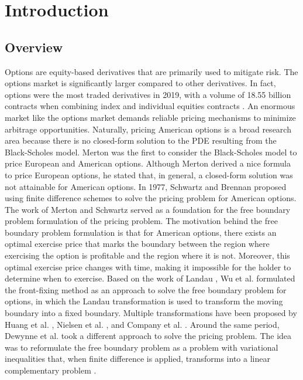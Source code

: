 \section{Introduction}

\subsection{Overview}

Options are equity-based derivatives that are primarily used to mitigate risk. The options market is significantly larger compared to other derivatives. In fact, options were the most traded derivatives in 2019, with a volume of 18.55 billion contracts when combining index and individual equities contracts \cite{statista_2019}. An enormous market like the options market demands reliable pricing mechanisms to minimize arbitrage opportunities. Naturally, pricing American options is a broad research area because there is no closed-form solution to the PDE resulting from the Black-Scholes model. Merton\cite{merton_1973} was the first to consider the Black-Scholes\cite{black_scholes_1973} model to price European and American options. Although Merton derived a nice formula to price European options, he stated that, in general, a closed-form solution was not attainable for American options. In 1977, Schwartz \cite{schwartz_197779} and Brennan \cite{brennan_1997} proposed using finite difference schemes to solve the pricing problem for American options. The work of Merton and Schwartz served as a foundation for the free boundary problem formulation of the pricing problem. The motivation behind the free boundary problem formulation is that for American options, there exists an optimal exercise price that marks the boundary between the region where exercising the option is profitable and the region where it is not. Moreover, this optimal exercise price changes with time, making it impossible for the holder to determine when to exercise. Based on the work of Landau \cite{landau_1950_heat_ci}, Wu et al. \cite{wu1997front} formulated the front-fixing method as an approach to solve the free boundary problem for options, in which the Landau transformation is used to transform the moving boundary into a fixed boundary. Multiple transformations have been proposed by Huang et al. \cite{huang_2000}, Nielsen et al. \cite{nielsen_2001}, and Company et al. \cite{company_egorova_jodar_2014}. Around the same period, Dewynne et al. \cite{dewynne_howison_rupf_wilmott_1993} took a different approach to solve the pricing problem. The idea was to reformulate the free boundary problem as a problem with variational inequalities that, when finite difference is applied, transforms into a linear complementary problem \cite{dantzig_1968}.

